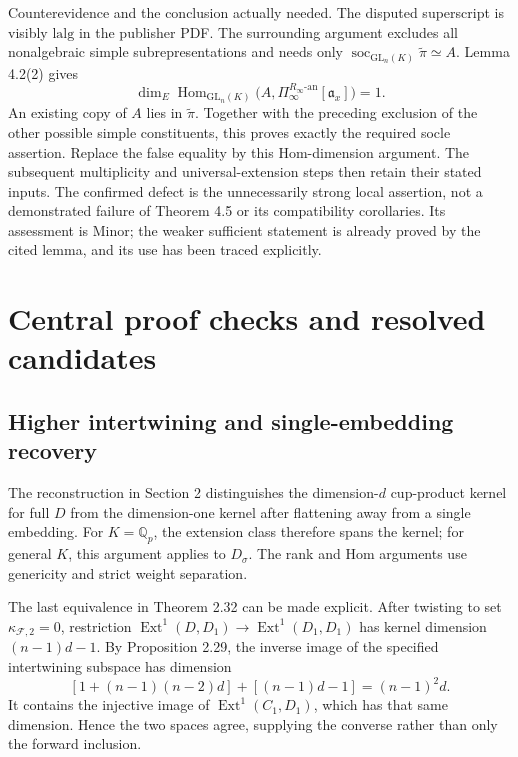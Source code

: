 \documentclass[10pt]{article}
\begin{document}
Counterevidence and the conclusion actually needed. The disputed superscript is visibly \(\mathrm{lalg}\) in the publisher PDF. The surrounding argument excludes all nonalgebraic simple subrepresentations and needs only \(\operatorname{soc}_{\mathrm{GL}_n(K)}\widetilde\pi\simeq A\). Lemma 4.2(2) gives \[\dim_E\operatorname{Hom}_{\mathrm{GL}_n(K)}
   \bigl(A,\Pi_\infty^{R_\infty\text{-an}}[\mathfrak a_x]\bigr)=1 .\] An existing copy of \(A\) lies in \(\widetilde\pi\). Together with the preceding exclusion of the other possible simple constituents, this proves exactly the required socle assertion. Replace the false equality by this Hom-dimension argument. The subsequent multiplicity and universal-extension steps then retain their stated inputs. The confirmed defect is the unnecessarily strong local assertion, not a demonstrated failure of Theorem 4.5 or its compatibility corollaries. Its assessment is Minor; the weaker sufficient statement is already proved by the cited lemma, and its use has been traced explicitly.\par
\section*{Central proof checks and resolved candidates}
\subsection*{Higher intertwining and single-embedding recovery}
The reconstruction in Section 2 distinguishes the dimension-\(d\) cup-product kernel for full \(D\) from the dimension-one kernel after flattening away from a single embedding. For \(K=\mathbb Q_p\), the extension class therefore spans the kernel; for general \(K\), this argument applies to \(D_\sigma\). The rank and Hom arguments use genericity and strict weight separation.\par
The last equivalence in Theorem 2.32 can be made explicit. After twisting to set \(\kappa_{\mathcal F,2}=0\), restriction \(\operatorname{Ext}^1(D,D_1)\to\operatorname{Ext}^1(D_1,D_1)\) has kernel dimension \((n-1)d-1\). By Proposition 2.29, the inverse image of the specified intertwining subspace has dimension \[[1+(n-1)(n-2)d]+[(n-1)d-1]=(n-1)^2d .\] It contains the injective image of \(\operatorname{Ext}^1(C_1,D_1)\), which has that same dimension. Hence the two spaces agree, supplying the converse rather than only the forward inclusion.\par
\end{document}
